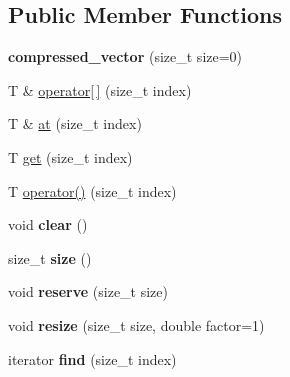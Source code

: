 \subsection*{Public Member Functions}
\begin{DoxyCompactItemize}
\item 
\hypertarget{classutil_1_1compressed__vector_a9bdc90e74fbcc24a388b88600a3e31b4}{{\bfseries compressed\+\_\+vector} (size\+\_\+t size=0)}\label{classutil_1_1compressed__vector_a9bdc90e74fbcc24a388b88600a3e31b4}

\item 
T \& \hyperlink{classutil_1_1compressed__vector_a05a64cdbbdbe84b71cea2fdf1edd3b42}{operator\mbox{[}$\,$\mbox{]}} (size\+\_\+t index)
\item 
T \& \hyperlink{classutil_1_1compressed__vector_a68900a49a6343732bd13c4275d95ddc2}{at} (size\+\_\+t index)
\item 
T \hyperlink{classutil_1_1compressed__vector_abc2315876a7c917af0b55e744c5c3e2e}{get} (size\+\_\+t index)
\item 
T \hyperlink{classutil_1_1compressed__vector_a0731dce280ad109f320e114fe4fd11d5}{operator()} (size\+\_\+t index)
\item 
\hypertarget{classutil_1_1compressed__vector_a5c3c5e443c9e6d51009d2e6b38e8b221}{void {\bfseries clear} ()}\label{classutil_1_1compressed__vector_a5c3c5e443c9e6d51009d2e6b38e8b221}

\item 
\hypertarget{classutil_1_1compressed__vector_a0a9d78c85c4fd21b2808cc101e6e4753}{size\+\_\+t {\bfseries size} ()}\label{classutil_1_1compressed__vector_a0a9d78c85c4fd21b2808cc101e6e4753}

\item 
\hypertarget{classutil_1_1compressed__vector_a02e2e2db6c609f32cd38f1034a2491ac}{void {\bfseries reserve} (size\+\_\+t size)}\label{classutil_1_1compressed__vector_a02e2e2db6c609f32cd38f1034a2491ac}

\item 
\hypertarget{classutil_1_1compressed__vector_a59ccaa4460c6f2d4a127c54391259c75}{void {\bfseries resize} (size\+\_\+t size, double factor=1)}\label{classutil_1_1compressed__vector_a59ccaa4460c6f2d4a127c54391259c75}

\item 
\hypertarget{classutil_1_1compressed__vector_ad6dee410753fe99240bd09a3e9bedef6}{iterator {\bfseries find} (size\+\_\+t index)}\label{classutil_1_1compressed__vector_ad6dee410753fe99240bd09a3e9bedef6}


\end{DoxyCompactItemize}
